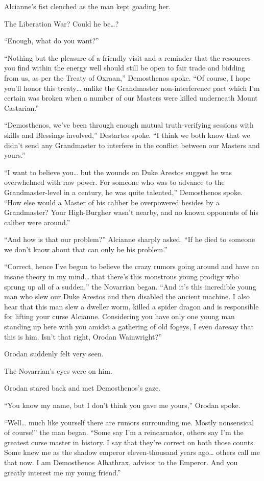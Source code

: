 \documentclass[a4paper,10pt]{book}
\begin{document}
Alcianne’s fist clenched as the man kept goading her.\par
The Liberation War? Could he be…?\par
“Enough, what do you want?”\par
“Nothing but the pleasure of a friendly visit and a reminder that the resources you find within the energy well should still be open to fair trade and bidding from us, as per the Treaty of Oxraan,” Demosthenos spoke. “Of course, I hope you’ll honor this treaty… unlike the Grandmaster non-interference pact which I’m certain was broken when a number of our Masters were killed underneath Mount Castarian.”\par
“Demosthenos, we’ve been through enough mutual truth-verifying sessions with skills and Blessings involved,” Destartes spoke. “I think we both know that we didn’t send any Grandmaster to interfere in the conflict between our Masters and yours.”\par
“I want to believe you… but the wounds on Duke Arestos suggest he was overwhelmed with raw power. For someone who was to advance to the Grandmaster-level in a century, he was quite talented,” Demosthenos spoke. “How else would a Master of his caliber be overpowered besides by a Grandmaster? Your High-Burgher wasn’t nearby, and no known opponents of his caliber were around.”\par
“And how is that our problem?” Alcianne sharply asked. “If he died to someone we don’t know about that can only be his problem.”\par
“Correct, hence I’ve begun to believe the crazy rumors going around and have an insane theory in my mind… that there’s this monstrous young prodigy who sprung up all of a sudden,” the Novarrian began. “And it’s this incredible young man who slew our Duke Arestos and then disabled the ancient machine. I also hear that this man slew a dweller worm, killed a spider dragon and is responsible for lifting your curse Alcianne. Considering you have only one young man standing up here with you amidst a gathering of old fogeys, I even daresay that this is him. Isn’t that right, Orodan Wainwright?”\par
Orodan suddenly felt very seen.\par
The Novarrian’s eyes were on him.\par
Orodan stared back and met Demosthenos’s gaze.\par
“You know my name, but I don’t think you gave me yours,” Orodan spoke.\par
“Well… much like yourself there are rumors surrounding me. Mostly nonsensical of course!” the man began. “Some say I’m a reincarnator, others say I’m the greatest curse master in history. I say that they’re correct on both those counts. Some knew me as the shadow emperor eleven-thousand years ago… others call me that now. I am Demosthenos Albathrax, advisor to the Emperor. And you greatly interest me my young friend.”\par
\end{document}
